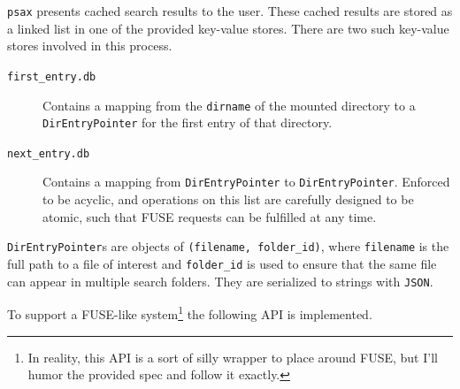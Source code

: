 \documentclass[a4paper]{report}
\newcommand{\inlinecode}{\texttt}
\begin{document}
\inlinecode{psax} presents cached search results to the user. These cached results are stored as a linked list in one of the provided key-value stores. There are two such key-value stores involved in this process.

\begin{description}
\item[\inlinecode{first\_entry.db}] Contains a mapping from the \inlinecode{dirname} of the mounted directory to a \inlinecode{DirEntryPointer} for the first entry of that directory.
\item[\inlinecode{next\_entry.db}] Contains a mapping from \inlinecode{DirEntryPointer} to \inlinecode{DirEntryPointer}. Enforced to be acyclic, and operations on this list are carefully designed to be atomic, such that FUSE requests can be fulfilled at any time.
\end{description}

\inlinecode{DirEntryPointer}s are objects of \inlinecode{(filename, folder\_id)}, where \inlinecode{filename} is the full path to a file of interest and \inlinecode{folder\_id} is used to ensure that the same file can appear in multiple search folders. They are serialized to strings with \inlinecode{JSON}.

To support a FUSE-like system\footnote{In reality, this API is a sort of silly wrapper to place around FUSE, but I'll humor the provided spec and follow it exactly.} the following API is implemented.
\end{document}

